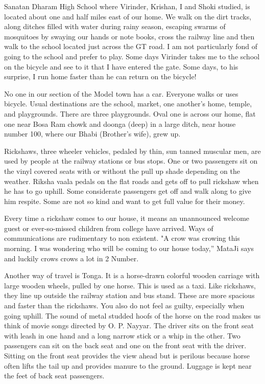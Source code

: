 Sanatan Dharam High School where Virinder, Krishan, I and Shoki studied,
is located about one and half miles east of our home. We walk on the dirt
tracks, along ditches filled with water during rainy season, escaping
swarms of mosquitoes by swaying our hands or note books, cross the railway
line and then walk to the school located just across the GT road. I am not
particularly fond of going to the school and prefer to play. Some days
Virinder takes me to the school on the bicycle and see to it that I have
entered the gate. Some days, to his surprise, I run home faster than he
can return on the bicycle!

No one in our section of the Model town has a car. Everyone walks or uses
bicycle. Usual destinations are the school, market, one another's home,
temple, and playgrounds. There are three playgrounds. Oval one is across
our home, flat one near Bosa Ram chowk and doonga (deep) in a large ditch,
near house number 100, where our Bhabi (Brother's wife), grew up.

Rickshaws, three wheeler vehicles, pedaled by thin, sun tanned muscular
men, are used by people at the railway stations or bus stops. One or two
passengers sit on the vinyl covered seats with or without the pull up
shade depending on the weather. Riksha vaala pedals on the flat roads and
gets off to pull rickshaw when he has to go uphill. Some considerate
passengers get off and walk along to give him respite. Some are not so
kind and want to get full value for their money.

Every time a rickshaw comes to our house, it means an unannounced welcome
guest or ever-so-missed children from college have arrived. Ways of
communications are rudimentary to non existent. "A crow was crowing this
morning. I was wondering who will be coming to our house today,” MataJi
says and luckily crows crows a lot in 2 Number.

Another way of travel is Tonga. It is a horse-drawn colorful wooden
carriage with large wooden wheels, pulled by one horse. This is used as
a taxi. Like rickshaws, they line up outside the railway station and bus
stand. These are more spacious and faster than the rickshaws. You also do
not feel as guilty, especially when going uphill. The sound of metal
studded hoofs of the horse on the road makes us think of movie songs
directed by O. P. Nayyar. The driver sits on the front seat with leash in
one hand and a long narrow stick or a whip in the other. Two passengers
can sit on the back seat and one on the front seat with the driver.
Sitting on the front seat provides the view ahead but is perilous because
horse often lifts the tail up and provides manure to the ground. Luggage
is kept near the feet of back seat passengers.

